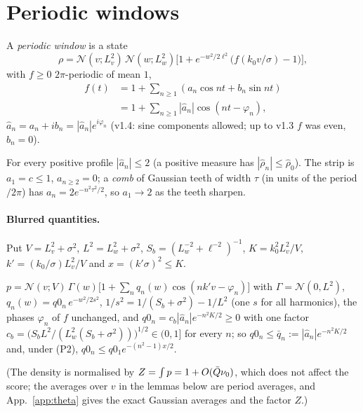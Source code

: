 \section{Periodic windows}
\label{sec:windows}

\begin{definition}
A \emph{periodic window} is a state
\begin{equation}
\rho=\mathcal N(v;L_v^2)\,\mathcal N(w;L_w^2)\Big[1+e^{-w^2/2\ell^2}\big(f(k_0v/\sigma)-1\big)\Big],
\label{eq:P}
\end{equation}
with $f\ge0$ $2\pi$-periodic of mean $1$,
\begin{equation*}
\begin{aligned}
f(t)&=1+\sum_{n\ge1}(a_n\cos nt+b_n\sin nt)\\
&=1+\sum_{n\ge1}|\hat a_n|\cos(nt-\varphi_n),
\end{aligned}
\end{equation*}
$\hat a_n=a_n+ib_n=|\hat a_n|e^{i\varphi_n}$ (v1.4: sine components allowed; up to v1.3 $f$ was even, $b_n=0$).
\end{definition}

For every positive profile $|\hat a_n|\le2$ (a positive measure has $|\hat\rho_n|\le\hat\rho_0$). The strip is $a_1=c\le1$, $a_{n\ge2}=0$; a
\emph{comb} of Gaussian teeth of width $\tau$ (in units of the period$/2\pi$) has $a_n=2e^{-n^2\tau^2/2}$, so $a_1\to2$ as the teeth sharpen.

\paragraph*{Blurred quantities.}
Put $V=L_v^2+\sigma^2$, $L^2=L_w^2+\sigma^2$, $S_b=(L_w^{-2}+\ell^{-2})^{-1}$, $K=k_0^2L_v^2/V$, $k'=(k_0/\sigma)L_v^2/V$ and $x=(k'\sigma)^2\le K$.

\begin{lemma} \proofst
\label{lem:AW1P}
$p=\mathcal N(v;V)\,\Gamma(w)\big[1+\sum_nq_n(w)\cos(nk'v-\varphi_n)\big]$ with $\Gamma=\mathcal N(0,L^2)$, $q_n(w)=q0_n\,e^{-w^2/2s^2}$,
$1/s^2=1/(S_b+\sigma^2)-1/L^2$ (one $s$ for all harmonics), the phases $\varphi_n$ of $f$ unchanged, and $q0_n=c_b|\hat a_n|e^{-n^2K/2}\ge0$ with one factor $c_b=\big(S_bL^2/(L_w^2(S_b+\sigma^2))\big)^{1/2}\in(0,1]$ for every $n$; so $q0_n\le\bar q_n:=|\hat a_n|e^{-n^2K/2}$ and, under (P2), $q0_n\le q0_1e^{-(n^2-1)x/2}$.
\end{lemma}
(The density is normalised by $Z=\int p=1+O(\bar Q\nu_0)$, which does not affect the score; the averages over $v$ in the lemmas below are period averages, and App.~\ref{app:theta} gives the exact Gaussian averages and the factor $Z$.)

